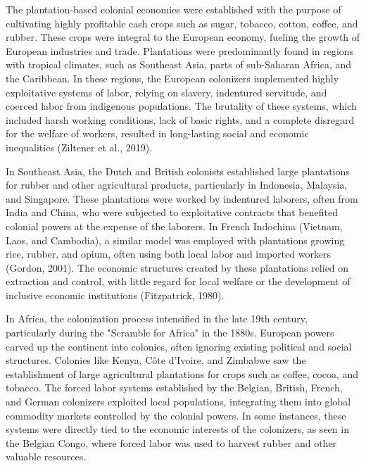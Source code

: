 \documentclass[12pt]{article}
\begin{document}
\vspace{0.2in}
\noindent The plantation-based colonial economies were established with the purpose of cultivating highly profitable cash crops such as sugar, tobacco, cotton, coffee, and rubber. These crops were integral to the European economy, fueling the growth of European industries and trade. Plantations were predominantly found in regions with tropical climates, such as Southeast Asia, parts of sub-Saharan Africa, and the Caribbean. In these regions, the European colonizers implemented highly exploitative systems of labor, relying on slavery, indentured servitude, and coerced labor from indigenous populations. The brutality of these systems, which included harsh working conditions, lack of basic rights, and a complete disregard for the welfare of workers, resulted in long-lasting social and economic inequalities (Ziltener et al., 2019).

\vspace{0.2in}
\noindent In Southeast Asia, the Dutch and British colonists established large plantations for rubber and other agricultural products, particularly in Indonesia, Malaysia, and Singapore. These plantations were worked by indentured laborers, often from India and China, who were subjected to exploitative contracts that benefited colonial powers at the expense of the laborers. In French Indochina (Vietnam, Laos, and Cambodia), a similar model was employed with plantations growing rice, rubber, and opium, often using both local labor and imported workers (Gordon, 2001). The economic structures created by these plantations relied on extraction and control, with little regard for local welfare or the development of inclusive economic institutions (Fitzpatrick, 1980).

\vspace{0.2in}
\noindent In Africa, the colonization process intensified in the late 19th century, particularly during the "Scramble for Africa" in the 1880s. European powers carved up the continent into colonies, often ignoring existing political and social structures. Colonies like Kenya, Côte d'Ivoire, and Zimbabwe saw the establishment of large agricultural plantations for crops such as coffee, cocoa, and tobacco. The forced labor systems established by the Belgian, British, French, and German colonizers exploited local populations, integrating them into global commodity markets controlled by the colonial powers. In some instances, these systems were directly tied to the economic interests of the colonizers, as seen in the Belgian Congo, where forced labor was used to harvest rubber and other valuable resources.
\end{document}
